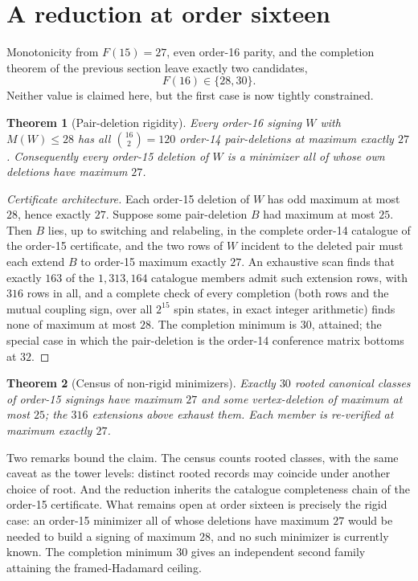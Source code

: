 \documentclass[11pt]{article}
\newtheorem{theorem}{Theorem}[section]
\theoremstyle{remark}
\begin{document}
\section{A reduction at order sixteen}

Monotonicity from $F(15)=27$, even order-16 parity, and the completion
theorem of the previous section leave exactly two candidates,
\[
 F(16)\in\{28,30\}.
\]
Neither value is claimed here, but the first case is now tightly
constrained.

\begin{theorem}[Pair-deletion rigidity]
Every order-16 signing $W$ with $M(W)\le28$ has all $\binom{16}{2}=120$
order-14 pair-deletions at maximum exactly $27$.  Consequently every
order-15 deletion of $W$ is a minimizer all of whose own deletions have
maximum $27$.
\end{theorem}

\begin{proof}[Certificate architecture]
Each order-15 deletion of $W$ has odd maximum at most $28$, hence exactly
$27$.  Suppose some pair-deletion $B$ had maximum at most $25$.  Then $B$
lies, up to switching and relabeling, in the complete order-14 catalogue of
the order-15 certificate, and the two rows of $W$ incident to the deleted
pair must each extend $B$ to order-15 maximum exactly $27$.  An exhaustive
scan finds that exactly $163$ of the $1{,}313{,}164$ catalogue members
admit such extension rows, with $316$ rows in all, and a complete check of
every completion (both rows and the mutual coupling sign, over all $2^{15}$
spin states, in exact integer arithmetic) finds none of maximum at most
$28$.  The completion minimum is $30$, attained; the special case in which
the pair-deletion is the order-14 conference matrix bottoms at $32$.
\end{proof}

\begin{theorem}[Census of non-rigid minimizers]
Exactly $30$ rooted canonical classes of order-15 signings have maximum
$27$ and some vertex-deletion of maximum at most $25$; the $316$
extensions above exhaust them.  Each member is re-verified at maximum
exactly $27$.
\end{theorem}

Two remarks bound the claim.  The census counts rooted classes, with the
same caveat as the tower levels: distinct rooted records may coincide
under another choice of root.  And the reduction inherits the catalogue
completeness chain of the order-15 certificate.  What remains open at
order sixteen is precisely the rigid case: an order-15 minimizer all of
whose deletions have maximum $27$ would be needed to build a signing of
maximum $28$, and no such minimizer is currently known.  The completion
minimum $30$ gives an independent second family attaining the
framed-Hadamard ceiling.
\end{document}

